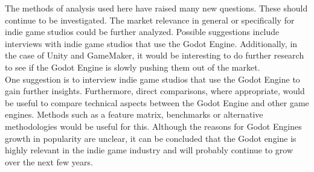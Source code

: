 The methods of analysis used here have raised many new questions.
These should continue to be investigated.
The market relevance in general or specifically for indie game studios could be further analyzed.
Possible suggestions include interviews with indie game studios that use the Godot Engine.
Additionally, in the case of Unity and GameMaker, it would be interesting to do further research to see if the Godot Engine is slowly pushing them out of the market.\\

One suggestion is to interview indie game studios that use the Godot Engine to gain further insights.
Furthermore, direct comparisons, where appropriate, would be useful to compare technical aspects between the Godot Engine and other game engines.
Methods such as a feature matrix, benchmarks or alternative methodologies would be useful for this. 
Although the reasons for Godot Engines growth in popularity are unclear, it can be concluded that the Godot engine is highly relevant in the indie game industry and will probably continue to grow over the next few years. 
